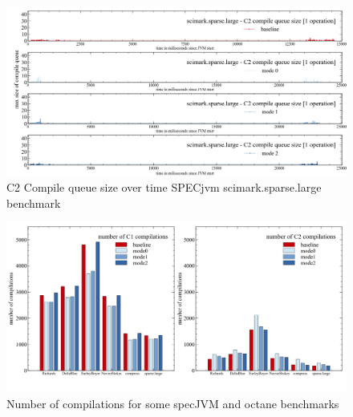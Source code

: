 \begin{figure}[ht]
  \begin{center}
    \centering
    \includegraphics[width=1.0\textwidth]{figures/spec_queue_scirmarksparselarge_separate_c2.png}
    \caption{C2 Compile queue size over time SPECjvm scimark.sparse.large benchmark}
    \label{f:spec_queue_scirmarksparselarge_separate_c2}
  \end{center}
\end{figure}
\begin{figure}[ht]
  \begin{center}
    \centering
    \includegraphics[width=1.0\textwidth]{figures/queue_total.png}
    \caption{Number of compilations for some specJVM and octane benchmarks}
    \label{f:queue_total}
  \end{center}
\end{figure}

\clearpage

